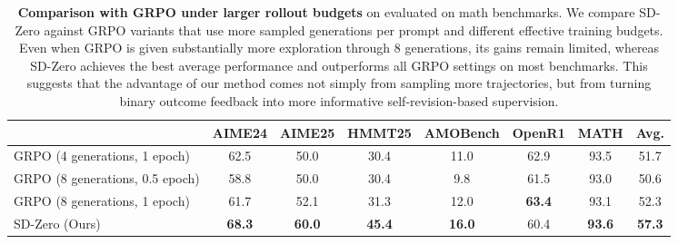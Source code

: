 \def\changesize#1{\fontsize{#1}{10.5pt}\selectfont}
\begin{table}[h]
\centering
\small
\fontsize{9pt}{10.5pt}\selectfont
    \renewcommand{\arraystretch}{1.2}
    \setlength{\tabcolsep}{2pt}
\begin{tabular}{lccccccc}
\toprule
\cmidrule(lr){2-7}
 & {AIME24} & {AIME25} & {HMMT25} & {AMOBench} & {OpenR1} & {MATH} & \textbf{Avg.}\\
\midrule
GRPO (4 generations, 1 epoch)                       & 62.5 & 50.0 & 30.4 & 11.0 & 62.9 & 93.5 & 51.7 \\
GRPO (8 generations, 0.5 epoch)                    & 58.8 & 50.0 & 30.4 & 9.8  & 61.5 & 93.0 & 50.6 \\
GRPO (8 generations, 1 epoch)                      & 61.7 & 52.1 & 31.3 & 12.0 & \textbf{63.4} & 93.1 & 52.3 \\
SD-Zero (Ours)                                     & \textbf{68.3} & \textbf{60.0} & \textbf{45.4} & \textbf{16.0} & 60.4 & \textbf{93.6} & \textbf{57.3} \\

\bottomrule
\end{tabular}
\caption{\textbf{Comparison with GRPO under larger rollout budgets} on \qwen{} evaluated on math benchmarks. We compare SD-Zero against GRPO variants that use more sampled generations per prompt and different effective training budgets. Even when GRPO is given substantially more exploration through 8 generations, its gains remain limited, whereas SD-Zero achieves the best average performance and outperforms all GRPO settings on most benchmarks. This suggests that the advantage of our method comes not simply from sampling more trajectories, but from turning binary outcome feedback into more informative self-revision-based supervision.}
\label{tab:grpo_ablation}
\end{table}